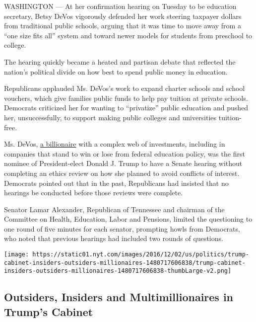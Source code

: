 WASHINGTON --- At her confirmation hearing on Tuesday to be education
secretary, Betsy DeVos vigorously defended her work steering taxpayer
dollars from traditional public schools, arguing that it was time to
move away from a ``one size fits all'' system and toward newer models
for students from preschool to college.

The hearing quickly became a heated and partisan debate that reflected
the nation's political divide on how best to spend public money in
education.

Republicans applauded Ms. DeVos's work to expand charter schools and
school vouchers, which give families public funds to help pay tuition at
private schools. Democrats criticized her for wanting to ``privatize''
public education and pushed her, unsuccessfully, to support making
public colleges and universities tuition-free.

Ms. DeVos,
\href{https://www.nytimes.com/2017/01/09/us/politics/betsy-devos-education-secretary.html}{a
billionaire} with a complex web of investments, including in companies
that stand to win or lose from federal education policy, was the first
nominee of President-elect Donald J. Trump to have a Senate hearing
without completing an ethics review on how she planned to avoid
conflicts of interest. Democrats pointed out that in the past,
Republicans had insisted that no hearings be conducted before those
reviews were complete.

Senator Lamar Alexander, Republican of Tennessee and chairman of the
Committee on Health, Education, Labor and Pensions, limited the
questioning to one round of five minutes for each senator, prompting
howls from Democrats, who noted that previous hearings had included two
rounds of questions.

\href{https://www.nytimes.com/interactive/2016/12/05/us/politics/trump-cabinet-insiders-outsiders-millionaires.html}{}

\texttt{[image: https://static01.nyt.com/images/2016/12/02/us/politics/trump-cabinet-insiders-outsiders-millionaires-1480717606838/trump-cabinet-insiders-outsiders-millionaires-1480717606838-thumbLarge-v2.png]}

\hypertarget{outsiders-insiders-and-multimillionaires-in-trumps-cabinet}{%
\subsection{Outsiders, Insiders and Multimillionaires in Trump's
Cabinet}\label{outsiders-insiders-and-multimillionaires-in-trumps-cabinet}}

